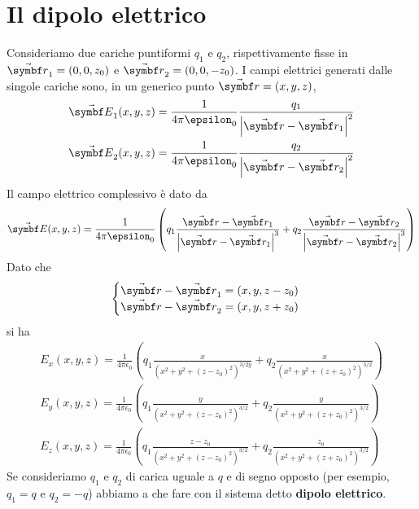\section{Il dipolo elettrico}
Consideriamo due cariche puntiformi $q_1$ e $q_2$, rispettivamente fisse in $\vba{r}_1=\left(0,0,z_0\right)$ e $\vba{r}_2=\left(0,0,-z_0\right)$. I campi elettrici generati dalle singole cariche sono, in un generico punto $\vba{r}=(x,y,z)$,
\begin{gather*}
	\vba{E}_1(x,y,z)=\frac{1}{4\pi\epsilon_0}\frac{q_1}{\abs{\vba{r}-\vba{r_1}}^2}\\
	\vba{E}_2(x,y,z)=\frac{1}{4\pi\epsilon_0}\frac{q_2}{\abs{\vba{r}-\vba{r_2}}^2}
\end{gather*}
Il campo elettrico complessivo è dato da
\begin{equation}
	\vba{E}(x,y,z)=\frac{1}{4\pi\epsilon_0}\left(q_1\frac{\vba{r}-\vba{r_1}}{\abs{\vba{r}-\vba{r_1}}^3}+q_2\frac{\vba{r}-\vba{r_2}}{\abs{\vba{r}-\vba{r_2}}^3}\right)
\end{equation}
Dato che
\begin{equation*}
	\begin{cases}
		\vba{r}-\vba{r}_1=\left(x,y,z-z_0\right)\\
		\vba{r}-\vba{r}_2=\left(x,y,z+z_0\right)
	\end{cases}
\end{equation*}
si ha
\begin{gather*}
	E_x(x,y,z)=\frac{1}{4\pi\epsilon_0}\left(q_1\frac{x}{(x^2+y^2+(z-z_0)^2)^{3/2y}}+q_2\frac{x}{(x^2+y^2+(z+z_0)^2)^{3/2}}\right)\\
	E_y(x,y,z)=\frac{1}{4\pi\epsilon_0}\left(q_1\frac{y}{(x^2+y^2+(z-z_0)^2)^{3/2}}+q_2\frac{y}{(x^2+y^2+(z+z_0)^2)^{3/2}}\right)\\
	E_z(x,y,z)=\frac{1}{4\pi\epsilon_0}\left(q_1\frac{z-z_0}{(x^2+y^2+(z-z_0)^2)^{3/2}}+q_2\frac{z_0}{(x^2+y^2+(z+z_0)^2)^{3/2}}\right)
\end{gather*}
Se consideriamo $q_1$ e $q_2$ di carica uguale a $q$ e di segno opposto (per esempio, $q_1=q$ e $q_2=-q$) abbiamo a che fare con il sistema detto \textbf{dipolo elettrico}.
